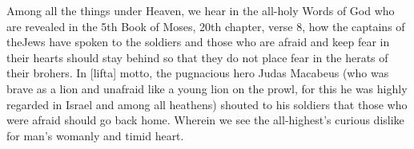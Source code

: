 \newpage


\newpage


Among all the things under Heaven, we hear in the all-holy Words of
God who are revealed in the 5th Book of Moses, 20th chapter,
verse 8, how the captains of theJews have spoken to the soldiers and
those who are afraid and keep fear in their hearts should stay behind
so that they do not place fear in the herats of their brohers. In
[lifta] motto, the pugnacious hero Judas Macabeus (who was brave as a
lion and unafraid like a young lion on the prowl, for this he was
highly regarded in Israel and among all heathens) shouted to his
soldiers that those who were afraid should go back home. Wherein we
see the all-highest's curious dislike for man's womanly and timid
heart.

